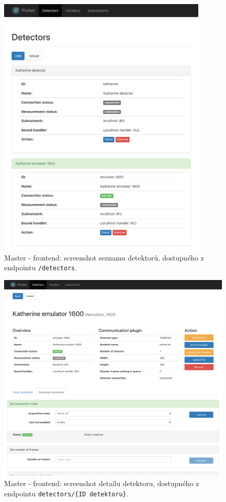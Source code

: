 \begin{figure}[h]
	\begin{center}
        \includegraphics[width=10cm]{figures/master_detectors.png}
	\end{center}
	\caption{Master - frontend: screenshot seznamu detektorů, dostupného z endpointu \texttt{/detectors}.}
	\label{fig:master:frontend:detectors}
\end{figure}

\begin{figure}[h]
	\begin{center}
        \includegraphics[width=15cm]{figures/master_detector_detail.png}
	\end{center}
    \caption{Master - frontend: screenshot detailu detektoru, dostupného z endpointu \texttt{detectors/\{ID detektoru\}}.}
	\label{fig:master:frontend:detector_detail}
\end{figure}

